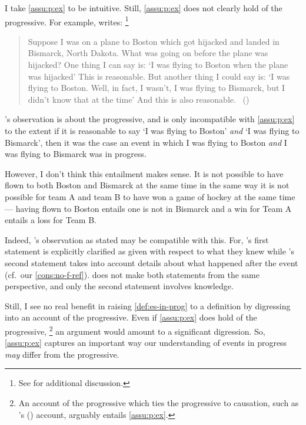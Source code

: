 \begin{note}
  I take \autoref{assu:p:ex} to be intuitive.
  Still, \autoref{assu:p:ex} does not clearly hold of the progressive.
  For example, \citeauthor{Landman:1992wh} writes:%
  \footnote{
    See \textcite{Bonomi:1997uq} for additional discussion.
  }

  \begin{quote}
    Suppose I was on a plane to Boston which got hijacked and landed in Bismarck, North Dakota.
    What was going on before the plane was hijacked?
    One thing I can say is:
    `I was flying to Boston when the plane was hijacked'
    This is reasonable.
    But another thing I could say is:
    `I was flying to Boston.
    Well, in fact, I wasn't, I was flying to Bismarck, but I didn't know that at the time'
    And this is also reasonable.%
    \mbox{ }\hfill\mbox{(\citeyear[30--31]{Landman:1992wh})}
  \end{quote}
  \citeauthor{Landman:1992wh}'s observation is about the progressive, and is only incompatible with \autoref{assu:p:ex} to the extent if it is reasonable to say `I was flying to Boston' \emph{and} `I was flying to Bismarck', then it was the case an event in which I was flying to Boston \emph{and} I was flying to Bismarck was in progress.

  However, I don't think this entailment makes sense.
  It is not possible to have flown to both Boston and Bismarck at the same time in the same way it is not possible for team A and team B to have won a game of hockey at the same time --- having flown to Boston entails one is not in Bismarck and a win for Team A entails a loss for Team B.

  Indeed, \citeauthor{Landman:1992wh}'s observation as stated may be compatible with this.
  For, \citeauthor{Landman:1992wh}'s first statement is explicitly clarified as given with respect to what they knew while \citeauthor{Landman:1992wh}'s second statement takes into account details about what happened after the event (cf.\ our \autoref{cons:no-f-ref}).
  \citeauthor{Landman:1992wh} does not make both statements from the same perspective, and only the second statement involves knowledge.

  Still, I see no real benefit in raising \autoref{def:es-in-prog} to a definition by digressing into an account of the progressive.
  Even if \autoref{assu:p:ex} does hold of the progressive,%
  \footnote{
    An account of the progressive which ties the progressive to causation, such as \citeauthor{Szabo:2004ul}'s (\citeyear{Szabo:2004ul}) account, arguably entails \autoref{assu:p:ex}.
  }
  an argument would amount to a significant digression.
  So, \autoref{assu:p:ex} captures an important way our understanding of events in progress \emph{may} differ from the progressive.
\end{note}



